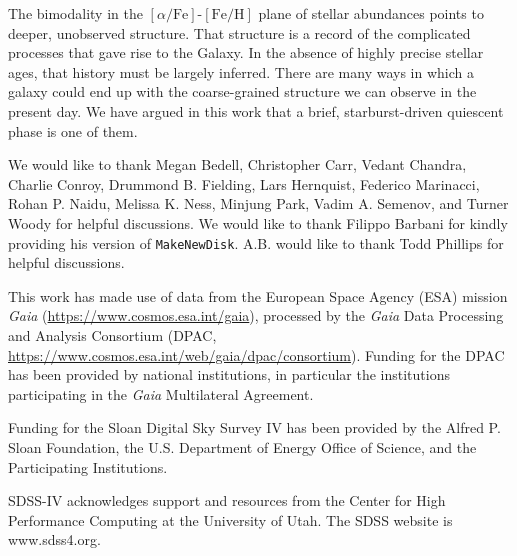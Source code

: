 \documentclass[linenumbers, twocolumn]{aastex631}
\newcommand{\FeH}{\ensuremath{[\textrm{Fe}/\textrm{H}]}}
\newcommand{\alphaFe}{\ensuremath{[\alpha/\textrm{Fe}]}}
\begin{document}
The bimodality in the \alphaFe{}-\FeH{} plane of stellar abundances points to deeper, unobserved structure. That structure is a record of the complicated processes that gave rise to the Galaxy. In the absence of highly precise stellar ages, that history must be largely inferred. There are many ways in which a galaxy could end up with the coarse-grained structure we can observe in the present day. We have argued in this work that a brief, starburst-driven quiescent phase is one of them.

\begin{acknowledgements}
We would like to thank Megan Bedell, Christopher Carr, Vedant Chandra, Charlie Conroy, Drummond B. Fielding, Lars Hernquist, Federico Marinacci, Rohan P. Naidu, Melissa K. Ness, Minjung Park, Vadim A. Semenov, and Turner Woody for helpful discussions. We would like to thank Filippo Barbani for kindly providing his version of \texttt{MakeNewDisk}. A.B. would like to thank Todd Phillips for helpful discussions.

This work has made use of data from the European Space Agency (ESA) mission {\it Gaia} (\url{https://www.cosmos.esa.int/gaia}), processed by the {\it Gaia} Data Processing and Analysis Consortium (DPAC, \url{https://www.cosmos.esa.int/web/gaia/dpac/consortium}). Funding for the DPAC has been provided by national institutions, in particular the institutions participating in the {\it Gaia} Multilateral Agreement.

Funding for the Sloan Digital Sky 
Survey IV has been provided by the 
Alfred P. Sloan Foundation, the U.S. 
Department of Energy Office of 
Science, and the Participating 
Institutions. 

SDSS-IV acknowledges support and 
resources from the Center for High 
Performance Computing  at the 
University of Utah. The SDSS 
website is www.sdss4.org.


\end{acknowledgements}
\end{document}

